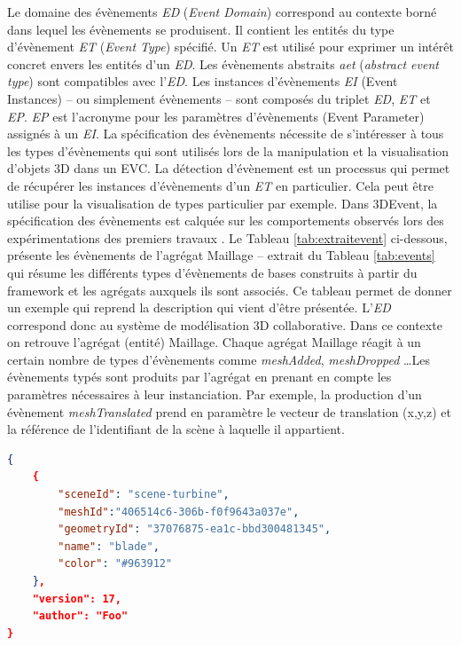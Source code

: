 Le domaine des évènements \textit{ED} (\textit{Event Domain}) correspond au 
contexte borné dans 
lequel les évènements se produisent. 
Il contient les entités du type d'évènement 
\textit{ET} (\textit{Event Type}) spécifié. Un \textit{ET} est utilisé pour exprimer un 
intérêt concret envers les entités d'un \textit{ED}. Les évènements abstraits 
\textit{aet} (\textit{abstract event type}) sont compatibles avec l'\textit{ED}. Les 
instances d'évènements \textit{EI} (Event Instances) -- ou simplement 
évènements -- sont composés du triplet \textit{ED}, \textit{ET} et \textit{EP}. 
\textit{EP} est l'acronyme pour les paramètres d'évènements (Event Parameter) 
assignés à un \textit{EI}. La spécification des évènements nécessite de 
s'intéresser à tous les types d'évènements qui sont utilisés lors de la manipulation 
et la visualisation d'objets 3D dans un \gls{EVC}. La détection d'évènement est un 
processus qui permet de récupérer les instances d'évènements d'un \textit{ET} en 
particulier. Cela peut être utilise pour la visualisation de types particulier par 
exemple. Dans 3DEvent, la spécification des évènements est calquée sur les 
comportements observés lors des expérimentations des premiers travaux 
\cite{Desprat2015a, Desprat2015b}. Le Tableau \ref{tab:extraitevent} ci-dessous, 
présente les évènements de l'agrégat Maillage -- extrait du Tableau 
\ref{tab:events} qui résume les 
différents types d'évènements de bases construits à partir du framework et les 
agrégats auxquels ils sont associés. 
Ce tableau permet de donner un exemple qui reprend la description qui vient d'être 
présentée. L'\textit{ED} correspond donc au \og système de modélisation 3D 
collaborative\fg{}. 
Dans ce contexte on retrouve l'agrégat (entité) \og Maillage\fg{}. Chaque agrégat 
Maillage 
réagit à un certain nombre de types d'évènements comme \textit{meshAdded}, 
\textit{meshDropped} \dots Les évènements typés sont produits par l'agrégat en 
prenant en compte les paramètres nécessaires à leur instanciation. Par exemple, 
la production d'un évènement \textit{meshTranslated} prend en paramètre le 
vecteur de translation (x,y,z) et la référence de l'identifiant de la scène à laquelle il 
appartient.
\begin{lstlisting}[language=json,firstnumber=1,label=jsonexemple,caption=Mesh 
added to Scene event and parameters]
{
	{
		"sceneId": "scene-turbine",
		"meshId":"406514c6-306b-f0f9643a037e",
		"geometryId": "37076875-ea1c-bbd300481345",
		"name": "blade",
		"color": "#963912"
	},
	"version": 17,
	"author": "Foo"
}
\end{lstlisting}
